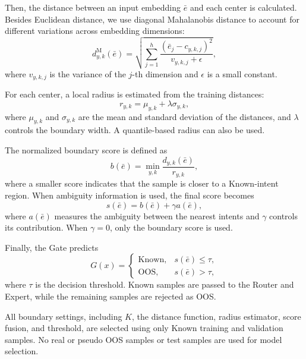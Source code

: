 \documentclass[11pt]{article}
\begin{document}
Then, the distance between an input embedding $\bar e$ and each center is calculated. Besides Euclidean distance, we use diagonal Mahalanobis distance to account for different variations across embedding dimensions:
\begin{equation}
d^{\mathrm M}_{y,k}(\bar e)
=
\sqrt{
\sum_{j=1}^{h}
\frac{(\bar e_j-c_{y,k,j})^2}
{v_{y,k,j}+\epsilon}
},
\label{eq:mahalanobis}
\end{equation}
where $v_{y,k,j}$ is the variance of the $j$-th dimension and $\epsilon$ is a small constant.

For each center, a local radius is estimated from the training distances:
\begin{equation}
r_{y,k}
=
\mu_{y,k}+\lambda\sigma_{y,k},
\label{eq:radius_mean_std}
\end{equation}
where $\mu_{y,k}$ and $\sigma_{y,k}$ are the mean and standard deviation of the distances, and $\lambda$ controls the boundary width. A quantile-based radius can also be used.

The normalized boundary score is defined as
\begin{equation}
b(\bar e)
=
\min_{y,k}
\frac{d_{y,k}(\bar e)}
{r_{y,k}},
\label{eq:normalized_union}
\end{equation}
where a smaller score indicates that the sample is closer to a Known-intent region. When ambiguity information is used, the final score becomes
\begin{equation}
s(\bar e)=b(\bar e)+\gamma a(\bar e),
\label{eq:fusion_score}
\end{equation}
where $a(\bar e)$ measures the ambiguity between the nearest intents and $\gamma$ controls its contribution. When $\gamma=0$, only the boundary score is used.

Finally, the Gate predicts
\begin{equation}
G(x)=
\begin{cases}
\mathrm{Known}, & s(\bar e)\leq\tau,\\
\mathrm{OOS}, & s(\bar e)>\tau,
\end{cases}
\label{eq:gate_decision}
\end{equation}
where $\tau$ is the decision threshold. Known samples are passed to the Router and Expert, while the remaining samples are rejected as OOS.

All boundary settings, including $K$, the distance function, radius estimator, score fusion, and threshold, are selected using only Known training and validation samples. No real or pseudo OOS samples or test samples are used for model selection.
\end{document}
